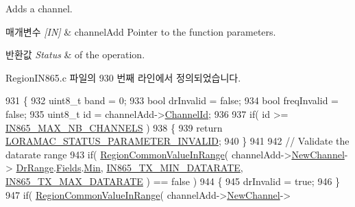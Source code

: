 Adds a channel. 


\begin{DoxyParams}{매개변수}
{\em \mbox{[}\+I\+N\mbox{]}} & channel\+Add Pointer to the function parameters.\\
\hline
\end{DoxyParams}

\begin{DoxyRetVals}{반환값}
{\em Status} & of the operation. \\
\hline
\end{DoxyRetVals}


Region\+I\+N865.\+c 파일의 930 번째 라인에서 정의되었습니다.


\begin{DoxyCode}
931 \{
932     uint8\_t band = 0;
933     \textcolor{keywordtype}{bool} drInvalid = \textcolor{keyword}{false};
934     \textcolor{keywordtype}{bool} freqInvalid = \textcolor{keyword}{false};
935     uint8\_t \textcolor{keywordtype}{id} = channelAdd->\mbox{\hyperlink{structs_channel_add_params_ae23f953dc29c360e56a3c856404a3276}{ChannelId}};
936 
937     \textcolor{keywordflow}{if}( \textcolor{keywordtype}{id} >= \mbox{\hyperlink{group___r_e_g_i_o_n_i_n865_ga6fbcf463cb8df05984d576d96383651d}{IN865\_MAX\_NB\_CHANNELS}} )
938     \{
939         \textcolor{keywordflow}{return} \mbox{\hyperlink{group___l_o_r_a_m_a_c_gga1d18f26b344040b3ec5c3db662919661ad0d3119f247d00e1787dda106fcb3017}{LORAMAC\_STATUS\_PARAMETER\_INVALID}};
940     \}
941 
942     \textcolor{comment}{// Validate the datarate range}
943     \textcolor{keywordflow}{if}( \mbox{\hyperlink{group___r_e_g_i_o_n_c_o_m_m_o_n_gafdd1c80d953e18d755a631b72a9c3bd3}{RegionCommonValueInRange}}( channelAdd->\mbox{\hyperlink{structs_channel_add_params_afc31493a105479490228fd896b20b45c}{NewChannel}}->
      \mbox{\hyperlink{structs_channel_params_ad4d9b041ea740886a05fa8a1d06997a2}{DrRange}}.\mbox{\hyperlink{unionu_dr_range_a5bdb9afc17112f2ae5f9548f0aee964f}{Fields}}.\mbox{\hyperlink{structu_dr_range_1_1s_fields_ad870086364c5eb410eec40e1025e3203}{Min}}, \mbox{\hyperlink{group___r_e_g_i_o_n_i_n865_ga334bf7f8b226ad91762f977490af0c72}{IN865\_TX\_MIN\_DATARATE}}, 
      \mbox{\hyperlink{group___r_e_g_i_o_n_i_n865_ga927945116c9bf6917614b894d45c0972}{IN865\_TX\_MAX\_DATARATE}} ) == \textcolor{keyword}{false} )
944     \{
945         drInvalid = \textcolor{keyword}{true};
946     \}
947     \textcolor{keywordflow}{if}( \mbox{\hyperlink{group___r_e_g_i_o_n_c_o_m_m_o_n_gafdd1c80d953e18d755a631b72a9c3bd3}{RegionCommonValueInRange}}( channelAdd->\mbox{\hyperlink{structs_channel_add_params_afc31493a105479490228fd896b20b45c}{NewChannel}}->

\end{DoxyCode}

